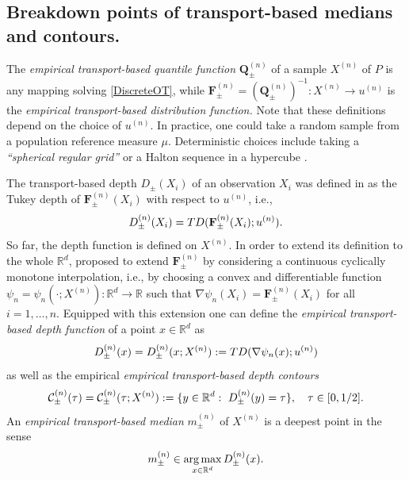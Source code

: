 \documentclass[11pt]{article}
\DeclareMathOperator*{\argmax}{arg\,max}
\newcommand{\R}{\mathbb{R}}
\theoremstyle{plain}
\theoremstyle{definition}
\begin{document}
\subsection{Breakdown points of transport-based medians and contours.}
%
The {\it empirical transport-based quantile function} $\mathbf{Q}_{ \pm }^{(n)}$ of a sample $X^{(n)}$ of $P$ is any mapping solving \eqref{DiscreteOT}, while $\mathbf{F}_{ \pm }^{(n)}=(\mathbf{Q}_{ \pm }^{(n)})^{-1}:X^{(n)}\to u^{(n)}$ is the {\it empirical transport-based distribution function.} 
%
Note that these definitions depend on the choice of $u^{(n)}$. In practice, one could take a random sample from a population reference measure $\mu$. Deterministic choices include taking a    {\it ``spherical regular grid''} \cite{HallinDelBarrioCuestaAlbertosMatran.21}  or  a Halton sequence in a hypercube   \cite{DebSen.19}.

The transport-based depth $D_\pm(X_i)$ of an observation $X_i$ was defined in \cite{ChernozhukovEtAl.17.AOS} as the Tukey depth of $\mathbf{F}_{ \pm }^{(n)} (X_i)$ with respect to  $ u^{(n)}$, i.e.,     $$ {\rm D}_\pm^{(n)}(X_i)={\rm TD}( \mathbf{F}_{ \pm }^{(n)} (X_i); u^{(n)}). $$ 
So far, the depth function is defined on $X^{(n)}$. In order to extend its definition to the whole $\R^d$, 
%
 \cite{HallinDelBarrioCuestaAlbertosMatran.21}   proposed to extend 
 $\mathbf{F}_{ \pm }^{(n)}$ by considering  a  continuous cyclically monotone interpolation, i.e.,  by choosing  a convex and differentiable function $\psi_n=\psi_{n}(\cdot; X^{(n)}):\R^d\to \R$ such that $\nabla\psi_n(X_i)=\mathbf{F}_{ \pm }^{(n)}(X_i)$ for all $i=1, \dots, n$. Equipped with this extension one can define the {\it empirical transport-based depth function} of a point $x\in \R^d$ as 
 $$ {\rm D}_\pm^{(n)}(x)={\rm D}_\pm^{(n)}(x;X^{(n)}):={\rm TD}( \nabla\psi_n (x); u^{(n)}) $$ 
 as well as the empirical  {\it empirical transport-based depth contours} 
$$ {\cal  C}_\pm^{(n)}(\tau)=\mathcal{C}_\pm^{(n)}(\tau; X^{(n)}):=\{y\in \R^d: \ {\rm D}_\pm^{(n)}(y)=\tau \}, \quad \tau\in [0,1/2]. $$
An {\it empirical  transport-based median} $m_\pm^{(n)}$ of  $X^{(n)}$ is a deepest point   in the sense 
$$ m_\pm^{(n)}\in \argmax_{x\in \R^d}  {\rm D}_\pm^{(n)}(x) .  $$ 
\end{document}
